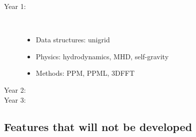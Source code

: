 \documentclass[11pt]{article}
\begin{document}
\begin{description}
\item[Year 1: ]\
\begin{itemize}
\item Data structures: unigrid
\item Physics: hydrodynamics, MHD, self-gravity
\item Methods: PPM, PPML, 3DFFT
\end{itemize}

\item[Year 2: ] 

\item[Year 3: ]
\end{description}
\subsection{Features that will not be developed}


\end{document}
